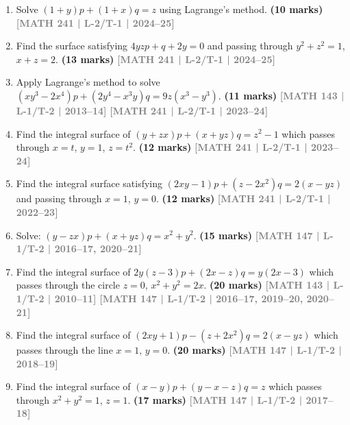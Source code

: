 \documentclass[12pt]{article}
\newcommand{\yr}[1]{\hfill\textcolor{gray}{\small\textbf{[#1]}}}
\newcommand{\mk}[1]{\textcolor{orange!70!black}{\small\textbf{(#1 marks)}}}
\begin{document}
\begin{enumerate}

\item Solve $(1+y)p+(1+x)q=z$ using Lagrange's method.
\mk{10} \yr{MATH 241 | L-2/T-1 | 2024--25}



\item Find the surface satisfying $4yzp+q+2y=0$ and passing through $y^{2}+z^{2}=1$, $x+z=2$.
\mk{13} \yr{MATH 241 | L-2/T-1 | 2024--25}





\item Apply Lagrange's method to solve $(xy^{3}-2x^{4})p+(2y^{4}-x^{3}y)q=9z(x^{3}-y^{3})$.
\mk{11} \yr{MATH 143 | L-1/T-2 | 2013--14} \yr{MATH 241 | L-2/T-1 | 2023--24}



\item Find the integral surface of $(y+zx)p+(x+yz)q=z^{2}-1$ which passes through $x=t$, $y=1$, $z=t^{2}$.
\mk{12} \yr{MATH 241 | L-2/T-1 | 2023--24}





\item Find the integral surface satisfying $(2xy-1)p+(z-2x^{2})q=2(x-yz)$ and passing through $x=1$, $y=0$.
\mk{12} \yr{MATH 241 | L-2/T-1 | 2022--23}





\item Solve: $(y-zx)p+(x+yz)q=x^{2}+y^{2}$.
\mk{15} \yr{MATH 147 | L-1/T-2 | 2016--17, 2020--21}





\item Find the integral surface of $2y(z-3)p+(2x-z)q=y(2x-3)$ which passes through the circle $z=0$, $x^{2}+y^{2}=2x$.
\mk{20} \yr{MATH 143 | L-1/T-2 | 2010--11} \yr{MATH 147 | L-1/T-2 | 2016--17, 2019--20, 2020--21}





\item Find the integral surface of $(2xy+1)p-(z+2x^{2})q=2(x-yz)$ which passes through the line $x=1$, $y=0$.
\mk{20} \yr{MATH 147 | L-1/T-2 | 2018--19}




\item Find the integral surface of $(x-y)p+(y-x-z)q=z$ which passes through $x^{2}+y^{2}=1$, $z=1$.
\mk{17} \yr{MATH 147 | L-1/T-2 | 2017--18}






\end{enumerate}
\end{document}

